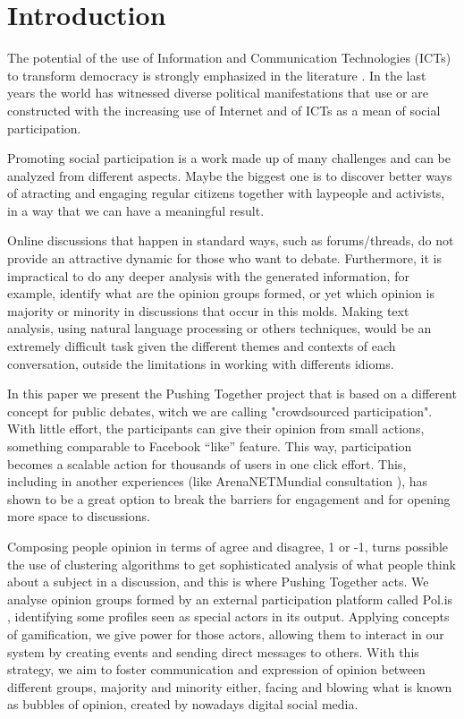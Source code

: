 \documentclass{llncs}
\begin{document}
\section{Introduction}
\label{sec:intro}

  The potential of the use of Information and Communication Technologies (ICTs)
to transform democracy is strongly emphasized in the literature
\cite{benkler} \cite{castells} \cite{levy}. In the last years the world has
witnessed diverse political manifestations that use or are constructed with
the increasing use of Internet and of ICTs as a mean of social participation.

  Promoting social participation is a work made up of many challenges and can
be analyzed from different aspects. Maybe the biggest one is to discover better
ways of atracting and engaging regular citizens together with laypeople and
activists, in a way that we can have a meaningful result.

  Online discussions that happen in standard ways, such as forums/threads, do
not provide an attractive dynamic for those who want to debate. Furthermore, it
is impractical to do any deeper analysis with the generated information, for
example, identify what are the opinion groups formed, or yet which opinion is
majority or minority in discussions that occur in this molds. Making text
analysis, using natural language processing or others techniques, would be an
extremely difficult task given the different themes and contexts of each
conversation, outside the limitations in working with differents idioms.

  In this paper we present the Pushing Together project that is based on a
different concept for public debates, witch we are calling "crowdsourced
participation". With little effort, the participants can give their
opinion from small actions, something comparable to Facebook ``like'' feature.
This way, participation becomes a scalable action for thousands of users in
one click effort. This, including in another experiences (like ArenaNETMundial
consultation \cite{arenanetmundial}), has shown to be a great option to break
the barriers for engagement and for opening more space to discussions.

  Composing people opinion in terms of agree and disagree, 1 or -1, turns
possible the use of clustering algorithms to get sophisticated analysis of what
people think about a subject in a discussion, and this is where Pushing
Together acts. We analyse opinion groups formed by an external participation
platform called Pol.is \cite{polisSite},
identifying some profiles seen as special actors in its output.
Applying concepts of gamification, we give power for those
actors, allowing them to interact in our system by creating events and
sending direct messages to others. With this strategy, we aim to foster
communication and expression of opinion between different groups, majority and
minority either, facing and blowing what is known as
bubbles \cite{polisInTaiwan} of opinion, created by nowadays digital
social media.
\end{document}
